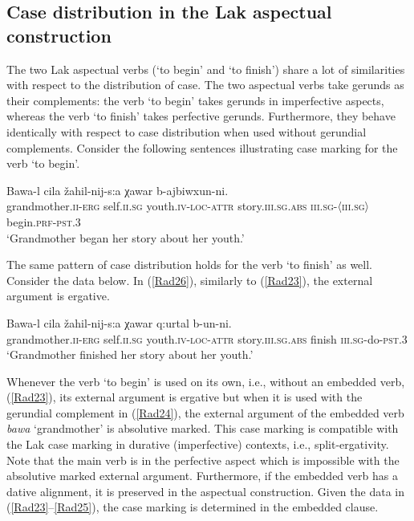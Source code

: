 \documentclass[output=paper]{langscibook}
\begin{document}
\subsection{Case distribution in the Lak aspectual construction}

The two Lak aspectual verbs (‘to begin’ and ‘to finish’) share a lot of similarities with respect to the distribution of case. The two aspectual verbs take gerunds as their complements: the verb ‘to begin’ takes gerunds in imperfective aspects, whereas the verb ‘to finish’ takes perfective gerunds. Furthermore, they behave identically with respect to case distribution when used without gerundial complements. Consider the following sentences illustrating case marking for the verb ‘to begin’.

\ea\label{Rad23}
\gll Bawa-l cila žahil-nij-s:a χawar b-ajbiwxun-ni.\\ 
grandmother.\textsc{ii-erg} self.\textsc{ii.sg} youth.\textsc{iv-loc-attr} story.\textsc{iii.sg.abs} 
\textsc{iii.sg-〈iii.sg〉}begin.\textsc{prf-pst.3}\\
\glt ‘Grandmother began her story about her youth.’
\z

The same pattern of case distribution holds for the verb ‘to finish’ as well. Consider the data below. In (\ref{Rad26}), similarly to (\ref{Rad23}), the external argument is ergative.

\ea\label{Rad26}
\gll Bawa-l cila žahil-nij-s:a χawar q:urtal b-un-ni.\\ 	
grandmother.\textsc{ii-erg} self.\textsc{ii.sg} youth.\textsc{iv-loc-attr} story.\textsc{iii.sg.abs}	finish \textsc{iii.sg}-do-\textsc{pst.3}\\ 
\glt ‘Grandmother finished her story about her youth.’
\z

Whenever the verb ‘to begin’ is used on its own, i.e., without an embedded verb, (\ref{Rad23}), its external argument is ergative but when it is used with the gerundial complement in (\ref{Rad24}), the external argument of the embedded verb \textit{bawa} ‘grandmother’ is absolutive marked. This case marking is compatible with the Lak case marking in durative (imperfective) contexts, i.e., split-ergativity. Note that the main verb is in the perfective aspect which is impossible with the absolutive marked external argument. Furthermore, if the embedded verb has a dative alignment, it is preserved in the aspectual construction. Given the data in (\ref{Rad23}--\ref{Rad25}), the case marking is determined in the embedded clause.
\end{document}

